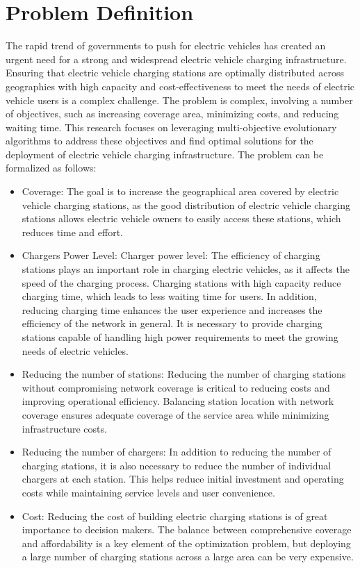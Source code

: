 \documentclass[12pt]{report}
\begin{document}
\section{Problem Definition}
The rapid trend of governments to push for electric vehicles has created an urgent need for a strong and widespread electric vehicle charging infrastructure. Ensuring that electric vehicle charging stations are optimally distributed across geographies with high capacity and cost-effectiveness to meet the needs of electric vehicle users is a complex challenge. The problem is complex, involving a number of objectives, such as increasing coverage area, minimizing costs, and reducing waiting time. This research focuses on leveraging multi-objective evolutionary algorithms to address these objectives and find optimal solutions for the deployment of electric vehicle charging infrastructure. The problem can be formalized as follows:
\begin{itemize}
    \item Coverage: The goal is to increase the geographical area covered by electric vehicle charging stations, as the good distribution of electric vehicle charging stations allows electric vehicle owners to easily access these stations, which reduces time and effort.
    
    \item Chargers Power Level: Charger power level: The efficiency of charging stations plays an important role in charging electric vehicles, as it affects the speed of the charging process. Charging stations with high capacity reduce charging time, which leads to less waiting time for users. In addition, reducing charging time enhances the user experience and increases the efficiency of the network in general. It is necessary to provide charging stations capable of handling high power requirements to meet the growing needs of electric vehicles.
    
    \item Reducing the number of stations: Reducing the number of charging stations without compromising network coverage is critical to reducing costs and improving operational efficiency. Balancing station location with network coverage ensures adequate coverage of the service area while minimizing infrastructure costs.
    
    \item Reducing the number of chargers: In addition to reducing the number of charging stations, it is also necessary to reduce the number of individual chargers at each station. This helps reduce initial investment and operating costs while maintaining service levels and user convenience.

        
    \item Cost: Reducing the cost of building electric charging stations is of great importance to decision makers. The balance between comprehensive coverage and affordability is a key element of the optimization problem, but deploying a large number of charging stations across a large area can be very expensive.
\end{itemize}
\end{document}

